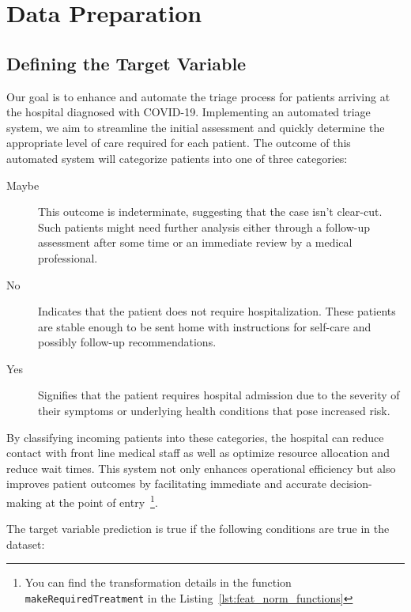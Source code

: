 \section{Data Preparation}

\subsection{Defining the Target Variable}
Our goal is to enhance and automate the triage process for patients arriving at the hospital diagnosed with COVID-19. Implementing an 
automated triage system, we aim to streamline the initial assessment
and quickly determine the appropriate level of care required for 
each patient. The outcome of this automated system will
categorize patients into one of three categories:

\begin{description}
\item[Maybe] This outcome is indeterminate, suggesting that the 
case isn't clear-cut. Such patients might need further analysis 
either through a follow-up assessment after some time or an 
immediate review by a medical professional.
\item[No] Indicates that the patient does not require hospitalization. 
These patients are stable enough to be sent home with 
instructions for self-care and possibly follow-up recommendations.
\item[Yes] Signifies that the patient requires hospital 
admission due to the severity of their symptoms or
underlying health conditions that pose increased risk.
\end{description}

By classifying incoming patients into these categories, the hospital 
can reduce contact with front line medical staff as well as optimize 
resource allocation and reduce wait times. 
This system not only enhances operational efficiency but also 
improves patient outcomes by facilitating immediate and accurate
decision-making at the point of entry~\footnote{You can find the 
transformation details in the function 
\texttt{makeRequiredTreatment} in the Listing~\ref{lst:feat_norm_functions}}.

The target variable prediction is true if the following conditions are
true in the dataset:

